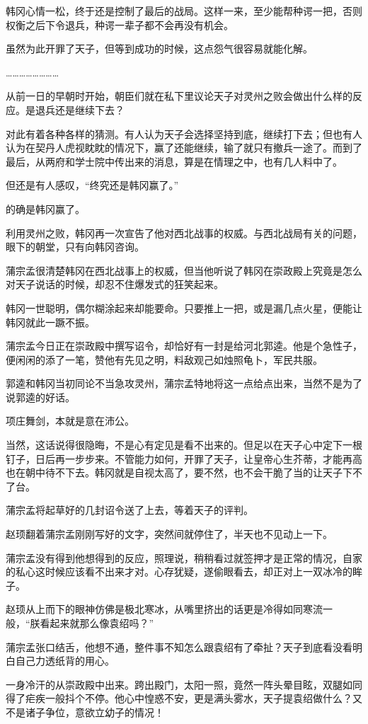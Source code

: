 韩冈心情一松，终于还是控制了最后的战局。这样一来，至少能帮种谔一把，否则权衡之后下令退兵，种谔一辈子都不会再没有机会。

虽然为此开罪了天子，但等到成功的时候，这点怨气很容易就能化解。

……………………

从前一日的早朝时开始，朝臣们就在私下里议论天子对灵州之败会做出什么样的反应。是退兵还是继续下去？

对此有着各种各样的猜测。有人认为天子会选择坚持到底，继续打下去；但也有人认为在契丹人虎视眈眈的情况下，赢了还能继续，输了就只有撤兵一途了。而到了最后，从两府和学士院中传出来的消息，算是在情理之中，也有几人料中了。

但还是有人感叹，“终究还是韩冈赢了。”

的确是韩冈赢了。

利用灵州之败，韩冈再一次宣告了他对西北战事的权威。与西北战局有关的问题，眼下的朝堂，只有向韩冈咨询。

蒲宗孟很清楚韩冈在西北战事上的权威，但当他听说了韩冈在崇政殿上究竟是怎么对天子说话的时候，却忍不住爆发式的狂笑起来。

韩冈一世聪明，偶尔糊涂起来却能要命。只要推上一把，或是漏几点火星，便能让韩冈就此一蹶不振。

蒲宗孟今日正在崇政殿中撰写诏令，却恰好有一封是给河北郭逵。他是个急性子，便闲闲的添了一笔，赞他有先见之明，料敌观己如烛照龟卜，军民共服。

郭逵和韩冈当初同论不当急攻灵州，蒲宗孟特地将这一点给点出来，当然不是为了说郭逵的好话。

项庄舞剑，本就是意在沛公。

当然，这话说得很隐晦，不是心有定见是看不出来的。但足以在天子心中定下一根钉子，日后再一步步来。不管能力如何，开罪了天子，让皇帝心生芥蒂，才能再高也在朝中待不下去。韩冈就是自视太高了，要不然，也不会干脆了当的让天子下不了台。

蒲宗孟将起草好的几封诏令送了上去，等着天子的评判。

赵顼翻着蒲宗孟刚刚写好的文字，突然间就停住了，半天也不见动上一下。

蒲宗孟没有得到他想得到的反应，照理说，稍稍看过就签押才是正常的情况，自家的私心这时候应该看不出来才对。心存犹疑，遂偷眼看去，却正对上一双冰冷的眸子。

赵顼从上而下的眼神仿佛是极北寒冰，从嘴里挤出的话更是冷得如同寒流一般，“朕看起来就那么像袁绍吗？”

蒲宗孟张口结舌，他想不通，整件事不知怎么跟袁绍有了牵扯？天子到底看没看明白自己力透纸背的用心。

一身冷汗的从崇政殿中出来。跨出殿门，太阳一照，竟然一阵头晕目眩，双腿如同得了疟疾一般抖个不停。他心中惶惑不安，更是满头雾水，天子提袁绍做什么？又不是诸子争位，意欲立幼子的情况！

